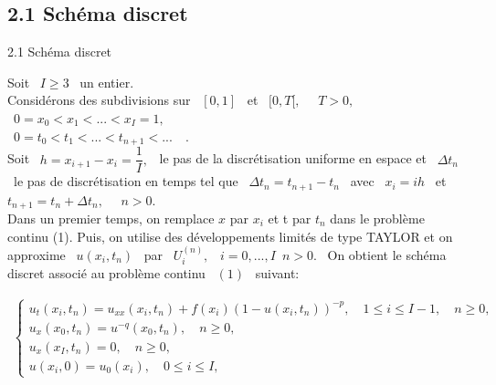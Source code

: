 \documentclass[10pt]{beamer}
\begin{document}
\begin{frame}
\subsection{2.1 Schéma discret}
\begin{block}{2.1 Schéma discret}\end{block}
 Soit \ $I\geqslant 3$ \ un entier.\\ 
Considérons des subdivisions sur \ $[0,1]$ \ et \ $[0,T[,$ \ \ $T>0,$ \ \\
\ $0=x_{0}<x_{1}<...<x_{I}=1,$ \ \\
\ $0=t_{0}<t_{1}<...<t_{n+1}<...$\ \ .\\
Soit \ $h=x_{i+1}-x_{i}=\dfrac{1}{I},$ \ le pas de la discrétisation uniforme en espace et \ $\Delta t_{n}$ \ le pas de discrétisation en temps tel que \ $\Delta t_{n}=t_{n+1}-t_{n}$ \ avec \ $x_{i}=ih$ \ et \ $t_{n+1}=t_{n}+\Delta t_{n},$ \ \ $n>0$. \\


Dans un premier temps, on remplace $x$ par $x_i$  et t par $t_{n}$ dans le problème continu (1). Puis, on utilise des développements limités de type TAYLOR et on  approxime \ $u(x_i,t_n)$ \  par \ $U_i^{(n)}, $ \  \quad $i=0,...,I$\ $n>0$. \ On obtient le schéma discret associé au problème continu \ $(1)$ \ suivant: \\
\end{frame}

\begin{frame}

\begin{block}


\begin{eqnarray}
	\begin{cases}
		u_{t}(x_{i},t_{n})=u_{xx}(x_{i},t_{n})+ f(x_{i})(1-u(x_{i},t_{n}))^{-p}, \quad  1\leqslant i\leqslant I-1, \quad n\geqslant 0,\\ 
		u_{x}(x_0,t_{n})=u^{-q}(x_{0},t_{n}),\quad  n\geqslant 0, \\ 
		u_{x}(x_I,t_{n})=0,\quad   n\geqslant 0,\\
		u(x_{i},0)=u_{0}(x_{i}),\quad 0\leqslant i\leqslant I,
	\end{cases}
\end{eqnarray}
  \end{block}
  
\end{frame}
\end{document}
